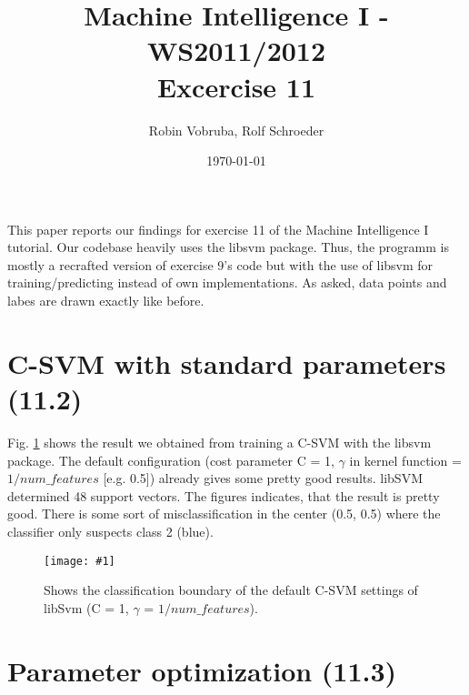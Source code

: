 \documentclass[a4paper,headings=small]{scrartcl}
\title{Machine Intelligence I - WS2011/2012\\Excercise 11}
\author{Robin Vobruba, Rolf Schroeder} %
\date{\today}
\newcommand{\image}[3]{
	\begin{figure}[htbp]
		\centering
		\texttt{[image: \#1]}
		\caption{#3}
		\label{fig:#1}
	\end{figure}
}
\begin{document}
\maketitle

This paper reports our findings for exercise 11 of the Machine Intelligence I tutorial. Our codebase heavily uses the libsvm package. Thus, the programm is mostly a recrafted version of exercise 9's code but with the use of libsvm for training/predicting instead of own implementations. As asked, data points and labes are drawn exactly like before.

\section{C-SVM with standard parameters (11.2)}

Fig. \ref{fig:out_classifierSvm_cSvmDefault} shows the result we obtained from training a C-SVM with the libsvm package. The default configuration (cost parameter C = 1, $\gamma$ in kernel function = $1/num\_features$ [e.g. 0.5]) already gives some pretty good results. libSVM determined 48 support vectors. The figures indicates, that the result is pretty good. There is some sort of misclassification in the center (0.5, 0.5) where the classifier only suspects class 2 (blue).

\image{out_classifierSvm_cSvmDefault}{0.9}%
	{Shows the classification boundary of the default C-SVM settings of libSvm (C = 1, $\gamma$ = $1/num\_features$).}


\section{Parameter optimization (11.3)}
\end{document}
